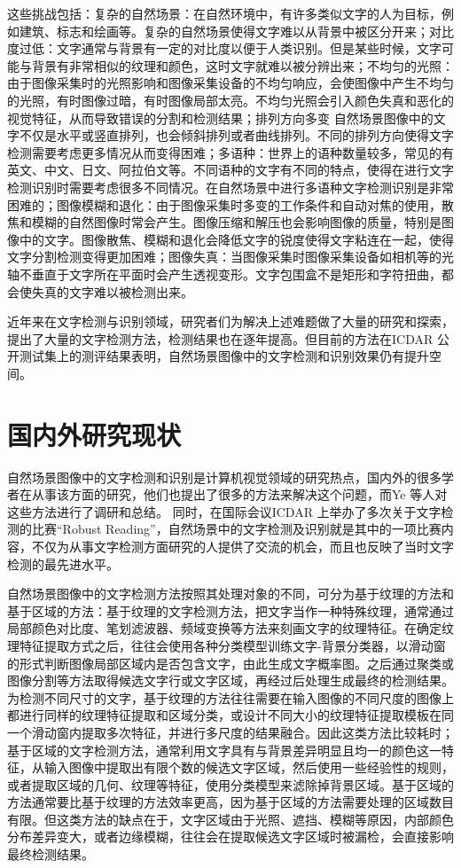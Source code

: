     这些挑战包括：复杂的自然场景：在自然环境中，有许多类似文字的人为目标，例如建筑、标志和绘画等。复杂的自然场景使得文字难以从背景中被区分开来；对比度过低：文字通常与背景有一定的对比度以便于人类识别。但是某些时候，文字可能与背景有非常相似的纹理和颜色，这时文字就难以被分辨出来；不均匀的光照：由于图像采集时的光照影响和图像采集设备的不均匀响应，会使图像中产生不均匀的光照，有时图像过暗，有时图像局部太亮。不均匀光照会引入颜色失真和恶化的视觉特征，从而导致错误的分割和检测结果；排列方向多变 自然场景图像中的文字不仅是水平或竖直排列，也会倾斜排列或者曲线排列。不同的排列方向使得文字检测需要考虑更多情况从而变得困难；多语种：世界上的语种数量较多，常见的有英文、中文、日文、阿拉伯文等。不同语种的文字有不同的特点，使得在进行文字检测识别时需要考虑很多不同情况。在自然场景中进行多语种文字检测识别是非常困难的；图像模糊和退化：由于图像采集时多变的工作条件和自动对焦的使用，散焦和模糊的自然图像时常会产生。图像压缩和解压也会影响图像的质量，特别是图像中的文字。图像散焦、模糊和退化会降低文字的锐度使得文字粘连在一起，使得文字分割检测变得更加困难；图像失真：当图像采集时图像采集设备如相机等的光轴不垂直于文字所在平面时会产生透视变形。文字包围盒不是矩形和字符扭曲，都会使失真的文字难以被检测出来。

    近年来在文字检测与识别领域，研究者们为解决上述难题做了大量的研究和探索，提出了大量的文字检测方法，检测结果也在逐年提高。但目前的方法在ICDAR 公开测试集上的测评结果表明，自然场景图像中的文字检测和识别效果仍有提升空间。

    \section{国内外研究现状}

    自然场景图像中的文字检测和识别是计算机视觉领域的研究热点，国内外的很多学者在从事该方面的研究，他们也提出了很多的方法来解决这个问题，而Ye 等人\cite{Ye2015Text}对这些方法进行了调研和总结。 同时，在国际会议ICDAR 上举办了多次关于文字检测的比赛“Robust Reading”\cite{Karatzas2013ICDAR}，自然场景中的文字检测及识别就是其中的一项比赛内容，不仅为从事文字检测方面研究的人提供了交流的机会，而且也反映了当时文字检测的最先进水平。

    自然场景图像中的文字检测方法按照其处理对象的不同，可分为基于纹理的方法和基于区域的方法：基于纹理的文字检测方法，把文字当作一种特殊纹理，通常通过局部颜色对比度、笔划滤波器、频域变换等方法来刻画文字的纹理特征。在确定纹理特征提取方式之后，往往会使用各种分类模型训练文字-背景分类器，以滑动窗的形式判断图像局部区域内是否包含文字，由此生成文字概率图。之后通过聚类或图像分割等方法取得候选文字行或文字区域，再经过后处理生成最终的检测结果。为检测不同尺寸的文字，基于纹理的方法往往需要在输入图像的不同尺度的图像上都进行同样的纹理特征提取和区域分类，或设计不同大小的纹理特征提取模板在同一个滑动窗内提取多次特征，并进行多尺度的结果融合。因此这类方法比较耗时；基于区域的文字检测方法，通常利用文字具有与背景差异明显且均一的颜色这一特征，从输入图像中提取出有限个数的候选文字区域，然后使用一些经验性的规则，或者提取区域的几何、纹理等特征，使用分类模型来滤除掉背景区域。基于区域的方法通常要比基于纹理的方法效率更高，因为基于区域的方法需要处理的区域数目有限。但这类方法的缺点在于，文字区域由于光照、遮挡、模糊等原因，内部颜色分布差异变大，或者边缘模糊，往往会在提取候选文字区域时被漏检，会直接影响最终检测结果。

